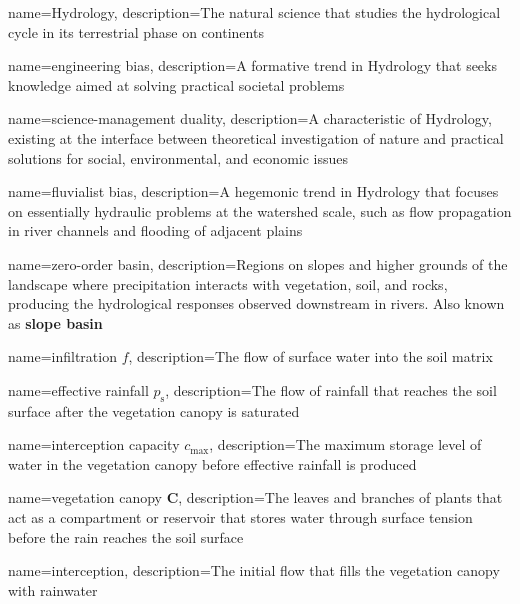{
    name=Hydrology,
    description={The natural science that studies the hydrological cycle in its terrestrial phase on continents}
}

{
    name=engineering bias,
    description={A formative trend in Hydrology that seeks knowledge aimed at solving practical societal problems}
}

{
    name=science-management duality,
    description={A characteristic of Hydrology, existing at the interface between theoretical investigation of nature and practical solutions for social, environmental, and economic issues}
}

{
    name=fluvialist bias,
    description={A hegemonic trend in Hydrology that focuses on essentially hydraulic problems at the watershed scale, such as flow propagation in river channels and flooding of adjacent plains}
}

{
    name=zero-order basin,
    description={Regions on slopes and higher grounds of the landscape where precipitation interacts with vegetation, soil, and rocks, producing the hydrological responses observed downstream in rivers. Also known as \textbf{slope basin}}
}

{
    name=infiltration $f$,
    description={The flow of surface water into the soil matrix}
}

{
    name=effective rainfall $p_{\text{s}}$,
    description={The flow of rainfall that reaches the soil surface after the vegetation canopy is saturated}
}

{
    name=interception capacity $c_{\text{max}}$,
    description={The maximum storage level of water in the vegetation canopy before effective rainfall is produced}
}

{
    name=vegetation canopy $\textbf{C}$,
    description={The leaves and branches of plants that act as a compartment or reservoir that stores water through surface tension before the rain reaches the soil surface}
}

{
    name=interception,
    description={The initial flow that fills the vegetation canopy with rainwater}
}

